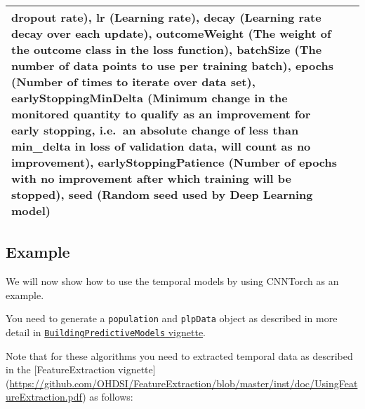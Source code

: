 \documentclass[]{article}
\begin{document}
\begin{longtable}[]{@{}ll@{}}
\begin{minipage}[t]{0.82\columnwidth}
dropout rate), lr (Learning rate), decay (Learning rate decay over each
update), outcomeWeight (The weight of the outcome class in the loss
function), batchSize (The number of data points to use per training
batch), epochs (Number of times to iterate over data set),
earlyStoppingMinDelta (Minimum change in the monitored quantity to
qualify as an improvement for early stopping, i.e.~an absolute change of
less than min\_delta in loss of validation data, will count as no
improvement), earlyStoppingPatience (Number of epochs with no
improvement after which training will be stopped), seed (Random seed
used by Deep Learning model)\strut
\end{minipage}\tabularnewline
\bottomrule
\end{longtable}

\subsection{Example}\label{example-1}

We will now show how to use the temporal models by using CNNTorch as an
example.

You need to generate a \texttt{population} and \texttt{plpData} object
as described in more detail in
\href{https://github.com/OHDSI/PatientLevelPrediction/blob/master/inst/doc/BuildingPredictiveModels.pdf}{\texttt{BuildingPredictiveModels}
vignette}.

Note that for these algorithms you need to extracted temporal data as
described in the {[}FeatureExtraction vignette{]}
(\url{https://github.com/OHDSI/FeatureExtraction/blob/master/inst/doc/UsingFeatureExtraction.pdf})
as follows:
\end{document}
